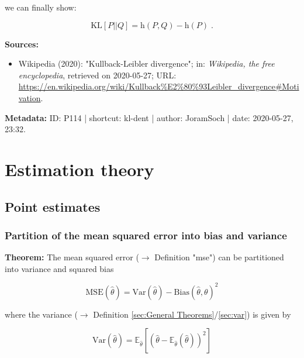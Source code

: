 \documentclass[a4paper,12pt,twoside]{book}
\begin{document}
we can finally show:

\begin{equation} \label{eq:kl-dent-KL-qed}
\mathrm{KL}[P||Q] = \mathrm{h}(P,Q) - \mathrm{h}(P) \; .
\end{equation}


\vspace{1em}
\textbf{Sources:}
\begin{itemize}
\item Wikipedia (2020): "Kullback-Leibler divergence"; in: \textit{Wikipedia, the free encyclopedia}, retrieved on 2020-05-27; URL: \url{https://en.wikipedia.org/wiki/Kullback%E2%80%93Leibler_divergence#Motivation}.
\end{itemize}


\vspace{1em}
\textbf{Metadata:} ID: P114 | shortcut: kl-dent | author: JoramSoch | date: 2020-05-27, 23:32.
\vspace{1em}



\pagebreak
\section{Estimation theory}

\subsection{Point estimates}

\subsubsection[\textbf{Partition of the mean squared error into bias and variance}]{Partition of the mean squared error into bias and variance} \label{sec:mse-bnv}
\setcounter{equation}{0}

\textbf{Theorem:} The mean squared error ($\rightarrow$ Definition "mse") can be partitioned into variance and squared bias

\begin{equation} \label{eq:mse-bnv-MSE}
\mathrm{MSE}(\hat{\theta}) = \mathrm{Var}(\hat{\theta}) - \mathrm{Bias}(\hat{\theta},\theta)^2
\end{equation}

where the variance ($\rightarrow$ Definition \ref{sec:General Theorems}/\ref{sec:var}) is given by

\begin{equation} \label{eq:mse-bnv-Var}
\mathrm{Var}(\hat{\theta}) = \mathbb{E}_{\hat{\theta}}\left[ \left( \hat{\theta} - \mathbb{E}_{\hat{\theta}}(\hat{\theta}) \right)^2 \right]
\end{equation}
\end{document}
